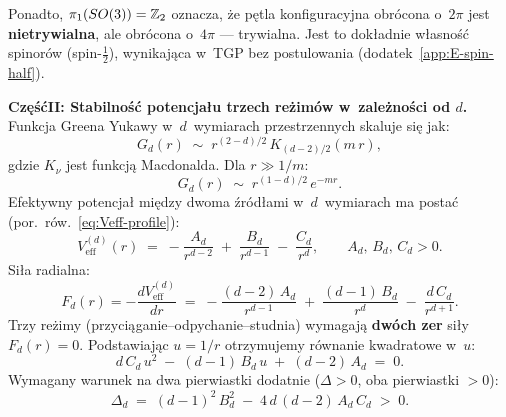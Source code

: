 \begin{remark}[Wzmocnienie ilo\'sciowe argumentu za $d = 3$]
Ponadto, $\pi_1(SO(3)) = \mathbb{Z}_2$ oznacza, \.ze p\k{e}tla
konfiguracyjna obr\'ocona o~$2\pi$ jest \textbf{nietrywialna},
ale obr\'ocona o~$4\pi$ --- trywialna. Jest to dok\l{}adnie
w\l{}asno\'s\'c spinor\'ow (spin-$\tfrac{1}{2}$),
wynikaj\k{a}ca w~TGP bez postulowania (dodatek~\ref{app:E-spin-half}).

\medskip
\noindent\textbf{Cz\k{e}\'s\'c\;II: Stabilno\'s\'c potencja\l{}u
trzech re\.zim\'ow w~zale\.zno\'sci od $d$.}
Funkcja Greena Yukawy w~$d$~wymiarach przestrzennych skaluje si\k{e}
jak:
\begin{equation}\label{eq:Green-d}
  G_d(r) \;\sim\; r^{(2-d)/2}\,K_{(d-2)/2}(m\,r),
\end{equation}
gdzie $K_\nu$ jest funkcj\k{a} Macdonalda. Dla $r \gg 1/m$:
\begin{equation}\label{eq:Green-asymp}
  G_d(r) \;\sim\; r^{(1-d)/2}\,e^{-mr}.
\end{equation}
Efektywny potencja\l{} mi\k{e}dzy dwoma \'zr\'od\l{}ami
w~$d$~wymiarach ma posta\'c (por.\ r\'ow.~\ref{eq:Veff-profile}):
\begin{equation}\label{eq:Veff-d}
  V_{\mathrm{eff}}^{(d)}(r) \;=\;
  -\frac{A_d}{r^{d-2}}
  \;+\; \frac{B_d}{r^{d-1}}
  \;-\; \frac{C_d}{r^{d}},
  \qquad A_d,\, B_d,\, C_d > 0.
\end{equation}
Si\l{}a radialna:
\begin{equation}\label{eq:Force-d}
  F_d(r) = -\frac{dV_{\mathrm{eff}}^{(d)}}{dr} \;=\;
  -\frac{(d{-}2)\,A_d}{r^{d-1}}
  \;+\; \frac{(d{-}1)\,B_d}{r^{d}}
  \;-\; \frac{d\,C_d}{r^{d+1}}.
\end{equation}
Trzy re\.zimy (przyci\k{a}ganie--odpychanie--studnia) wymagaj\k{a}
\textbf{dw\'och zer} si\l{}y $F_d(r) = 0$. Podstawiaj\k{a}c
$u = 1/r$ otrzymujemy r\'ownanie kwadratowe w~$u$:
\begin{equation}\label{eq:discriminant-d}
  d\,C_d\,u^2 \;-\; (d{-}1)\,B_d\,u
  \;+\; (d{-}2)\,A_d \;=\; 0.
\end{equation}
Wymagany warunek na dwa pierwiastki dodatnie
($\Delta > 0$, oba pierwiastki $> 0$):
\begin{equation}\label{eq:Delta-d}
  \Delta_d \;=\;
  (d{-}1)^2\,B_d^2 \;-\; 4\,d\,(d{-}2)\,A_d\,C_d
  \;>\; 0.
\end{equation}


\end{remark}

